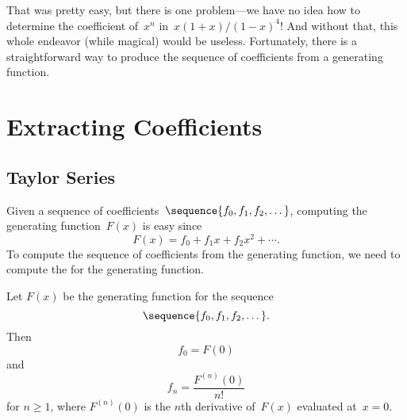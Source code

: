 That was pretty easy, but there is one problem---we have no idea how
to determine the coefficient of~$x^n$ in~$x(1 + x)/(1 - x)^4$!  And
without that, this whole endeavor (while magical) would be useless.
Fortunately, there is a straightforward way to produce the sequence of
coefficients from a generating function.

\section{Extracting Coefficients}

\subsection{Taylor Series}

Given a sequence of coefficients~$\sequence{f_0, f_1, f_2, \dots}$,
computing the generating function~$F(x)$ is easy since
\begin{equation*}
    F(x) = f_0 + f_1 x + f_2 x^2 + \cdots.
\end{equation*}
To compute the sequence of coefficients from the generating function,
we need to compute the  for the generating
function.

\begin{rul}
Let $F(x)$ be the generating function for the sequence
\begin{equation*}
\sequence{f_0, f_1, f_2, \dots}.
\end{equation*}
Then
\begin{equation*}
    f_0 = F(0)
\end{equation*}
and
\begin{equation*}
    f_n = \frac{F^{(n)}(0)}{n!}
\end{equation*}
for $n \ge 1$, where $F^{(n)}(0)$ is the $n$th derivative of~$F(x)$
evaluated at~$x = 0$.
\end{rul}

